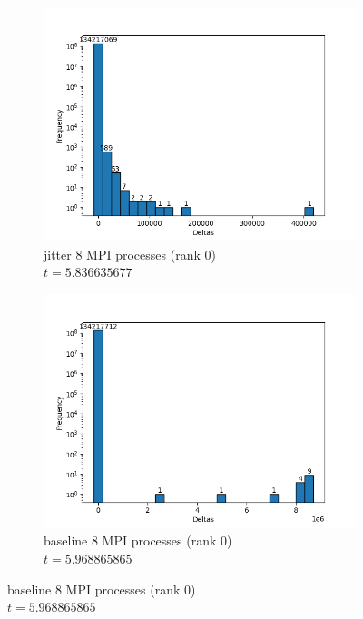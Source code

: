 \begin{figure}[H]
\begin{subfigure}{.42\textwidth}
  \centering
  \includegraphics[width=\textwidth]{./plots_jitter/jitter/output_size_8_rank_0_25.png}
  \caption{jitter 8 MPI processes (rank 0)\\$t=5.836635677$}
\end{subfigure}%
\begin{subfigure}{.42\textwidth}
  \centering
  \includegraphics[width=\textwidth]{./plots_jitter/jitter_baseline/output_size_8_rank_0_25.png}
  \caption{baseline 8 MPI processes (rank 0)\\$t=5.968865865$}
\end{subfigure}


\end{figure}
